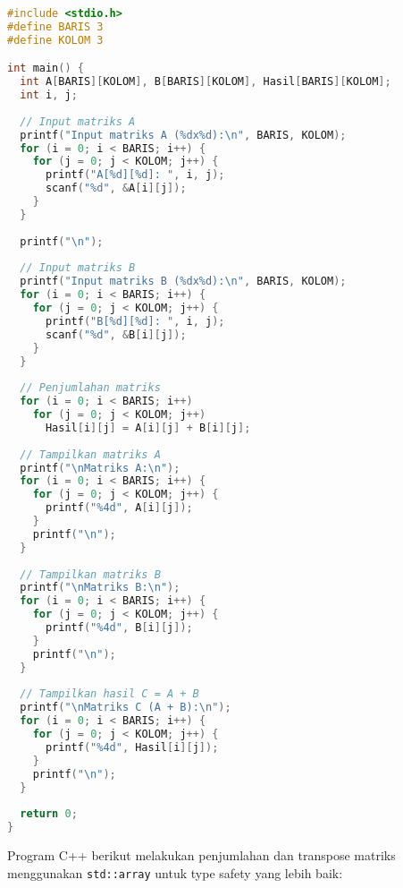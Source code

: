 \documentclass[../main.tex]{subfiles}
\begin{document}
\begin{lstlisting}[language=C, caption={Program operasi matriks di C}]
#include <stdio.h>
#define BARIS 3
#define KOLOM 3

int main() {
  int A[BARIS][KOLOM], B[BARIS][KOLOM], Hasil[BARIS][KOLOM];
  int i, j;
  
  // Input matriks A
  printf("Input matriks A (%dx%d):\n", BARIS, KOLOM);
  for (i = 0; i < BARIS; i++) {
    for (j = 0; j < KOLOM; j++) {
      printf("A[%d][%d]: ", i, j);
      scanf("%d", &A[i][j]);
    }
  }
  
  printf("\n");
  
  // Input matriks B
  printf("Input matriks B (%dx%d):\n", BARIS, KOLOM);
  for (i = 0; i < BARIS; i++) {
    for (j = 0; j < KOLOM; j++) {
      printf("B[%d][%d]: ", i, j);
      scanf("%d", &B[i][j]);
    }
  }
  
  // Penjumlahan matriks
  for (i = 0; i < BARIS; i++)
    for (j = 0; j < KOLOM; j++)
      Hasil[i][j] = A[i][j] + B[i][j];
  
  // Tampilkan matriks A
  printf("\nMatriks A:\n");
  for (i = 0; i < BARIS; i++) {
    for (j = 0; j < KOLOM; j++) {
      printf("%4d", A[i][j]);
    }
    printf("\n");
  }
  
  // Tampilkan matriks B
  printf("\nMatriks B:\n");
  for (i = 0; i < BARIS; i++) {
    for (j = 0; j < KOLOM; j++) {
      printf("%4d", B[i][j]);
    }
    printf("\n");
  }
  
  // Tampilkan hasil C = A + B
  printf("\nMatriks C (A + B):\n");
  for (i = 0; i < BARIS; i++) {
    for (j = 0; j < KOLOM; j++) {
      printf("%4d", Hasil[i][j]);
    }
    printf("\n");
  }
  
  return 0;
}
\end{lstlisting}

Program C++ berikut melakukan penjumlahan dan transpose matriks menggunakan \texttt{std::array} untuk type safety yang lebih baik:
\end{document}
